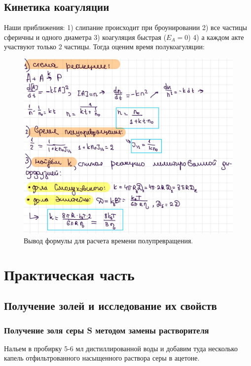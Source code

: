 \documentclass[a4paper,12pt]{article}
\begin{document}
\subsection{Кинетика коагуляции}

Наши приближения: 1) слипание происходит при броунировании 2) все частицы сферичны и одного диаметра 3) коагуляция быстрая ($E_A = 0$) 4) а каждом акте участвуют только 2 частицы. Тогда оценим время полукоагуляции:

\begin{figure}[h!]
    \centering
    \includegraphics[scale = 0.25]{calc.jpg}
    \caption{Вывод формулы для расчета времени полупревращения.}
    \label{fig : 1}
\end{figure}


 
\newpage
\section{Практическая часть}
\subsection{ Получение золей и исследование их свойств}
\subsubsection{Получение золя серы S методом замены растворителя}
Нальем в пробирку 5-6 мл дистиллированной воды и добавим туда несколько капель отфильтрованного насыщенного раствора серы в ацетоне. 
\end{document}
